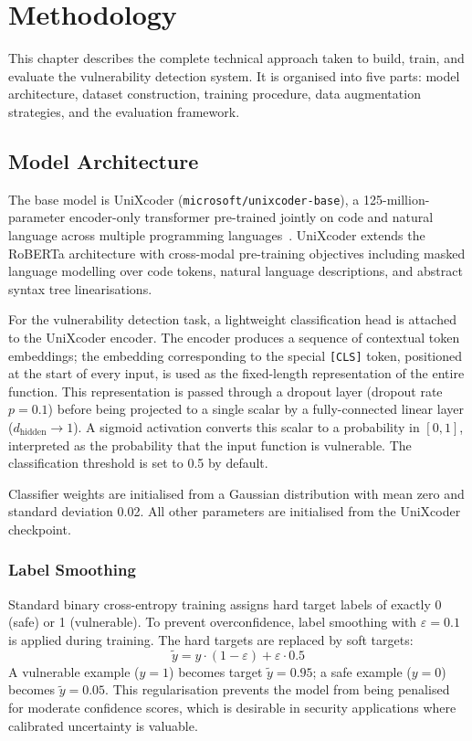 \chapter{Methodology}
\label{ch:methodology}

This chapter describes the complete technical approach taken to build, train, and evaluate
the vulnerability detection system.
It is organised into five parts: model architecture, dataset construction, training procedure,
data augmentation strategies, and the evaluation framework.

\section{Model Architecture}

The base model is UniXcoder (\texttt{microsoft/unixcoder-base}), a 125-million-parameter
encoder-only transformer pre-trained jointly on code and natural language across multiple
programming languages~\cite{guo2022unixcoder}.
UniXcoder extends the RoBERTa architecture with cross-modal pre-training objectives including
masked language modelling over code tokens, natural language descriptions, and abstract
syntax tree linearisations.

For the vulnerability detection task, a lightweight classification head is attached to the
UniXcoder encoder.
The encoder produces a sequence of contextual token embeddings; the embedding corresponding
to the special \texttt{[CLS]} token, positioned at the start of every input, is used as
the fixed-length representation of the entire function.
This representation is passed through a dropout layer (dropout rate $p = 0.1$) before being
projected to a single scalar by a fully-connected linear layer ($d_{\text{hidden}} \to 1$).
A sigmoid activation converts this scalar to a probability in $[0, 1]$, interpreted as
the probability that the input function is vulnerable.
The classification threshold is set to 0.5 by default.

Classifier weights are initialised from a Gaussian distribution with mean zero and
standard deviation 0.02.
All other parameters are initialised from the UniXcoder checkpoint.

\subsection{Label Smoothing}

Standard binary cross-entropy training assigns hard target labels of exactly 0 (safe) or
1 (vulnerable).
To prevent overconfidence, label smoothing with $\varepsilon = 0.1$ is applied during training.
The hard targets are replaced by soft targets:
\begin{equation}
  \tilde{y} = y \cdot (1 - \varepsilon) + \varepsilon \cdot 0.5
\end{equation}
A vulnerable example ($y = 1$) becomes target $\tilde{y} = 0.95$;
a safe example ($y = 0$) becomes $\tilde{y} = 0.05$.
This regularisation prevents the model from being penalised for moderate confidence scores,
which is desirable in security applications where calibrated uncertainty is valuable.

